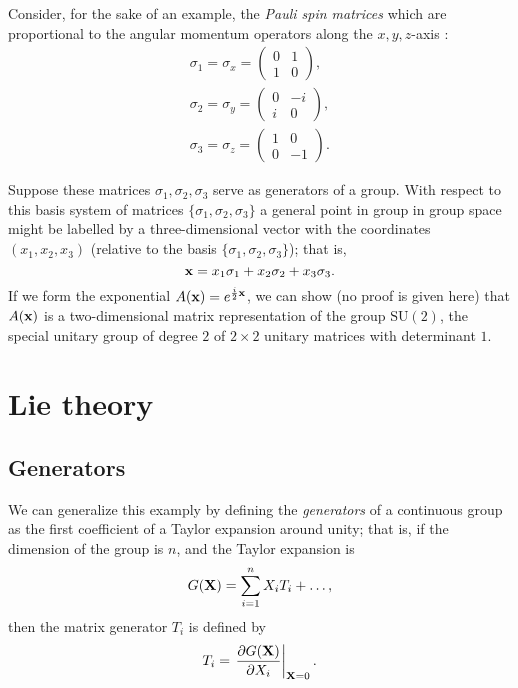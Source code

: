 {\color{blue}
\bexample
Consider, for the sake of an example, the
{\em Pauli spin matrices}
which are proportional to the angular momentum operators along the $x,y,z$-axis
\cite{schiff-55}:
\begin{equation}
\begin{split}
\sigma_1=\sigma_x
=
\begin{pmatrix}
0&1\\
1&0
\end{pmatrix}
,   \\
\sigma_2=\sigma_y
=
\begin{pmatrix}
0&-i\\
i&0
\end{pmatrix}
,   \\
\sigma_3=\sigma_z
=
\begin{pmatrix}
1&0\\
0&-1
\end{pmatrix}
.
\end{split}
\end{equation}

Suppose these matrices $\sigma_1,\sigma_2,\sigma_3$
serve as generators of a group.
With respect to this basis system of matrices $\{ \sigma_1,\sigma_2,\sigma_3\}$
a general point in group in group space might be labelled by a three-dimensional
vector with the coordinates $(x_1,x_2,x_3)$
(relative to the basis $\{ \sigma_1,\sigma_2,\sigma_3\}$);
that is,
\begin{equation}
{\bf x} =   x_1\sigma_1 + x_2\sigma_2 +x_3 \sigma_3.
\end{equation}
If we form the exponential $  A  ({\bf x})= e^{\frac{i}{2} {\bf x}}$,
we can show (no proof is given here)
that $  A  ({\bf x})$ is a two-dimensional matrix representation of the group $\textrm{SU}(2)$,
the special unitary group of degree $2$ of $2\times 2$ unitary matrices with determinant $1$.
}

\section{Lie theory}

\subsection{Generators}
We can generalize this examply by defining
the {\em generators}
of a continuous group as the first coefficient of a Taylor expansion
around unity; that is, if the dimension of the group is $n$, and the Taylor expansion is
\begin{equation}
  G  ({\bf X}) =   \sum_{i=1}^n X_i   T  _i + \ldots ,
\end{equation}
then the matrix generator $T_i$ is defined by
\begin{equation}
  T  _i = \left. \frac{\partial   G  ({\bf X})}{\partial X_i} \right|_{ {\bf X}=0}.
\end{equation}

